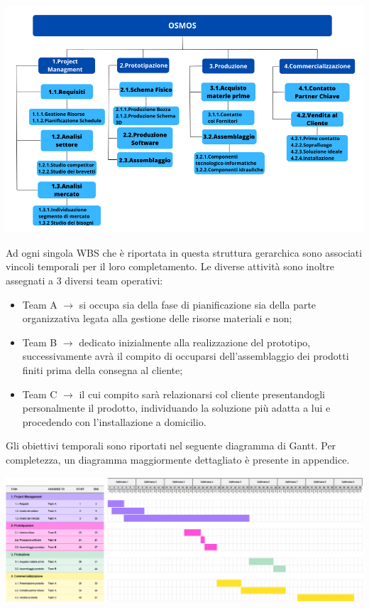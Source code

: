 \documentclass[a4paper, 12pt]{article}
\begin{document}
	\begin{center}
		\includegraphics[width=\textwidth]{Images/WBS.png}
	\end{center}
	Ad ogni singola WBS che è riportata in questa struttura gerarchica sono associati vincoli temporali per il loro completamento. Le diverse attività sono inoltre assegnati a 3 diversi team operativi:
	\begin{itemize}
		\item Team A $\rightarrow$ si occupa sia della fase di pianificazione sia della parte organizzativa legata alla gestione delle risorse materiali e non;
		\item Team B $\rightarrow$ dedicato inizialmente alla realizzazione del prototipo, successivamente avrà il compito di occuparsi dell'assemblaggio dei prodotti finiti prima della consegna al cliente;
		\item Team C $\rightarrow$ il cui compito sarà relazionarsi col cliente presentandogli personalmente il prodotto, individuando la soluzione più adatta a lui e procedendo con l'installazione a domicilio.
	\end{itemize}
	Gli obiettivi temporali sono riportati nel seguente diagramma di Gantt. Per completezza, un diagramma maggiormente dettagliato è presente in appendice.
	\begin{center}
		\includegraphics[width=\textwidth]{Images/gantt.png}
	\end{center}
	\newpage
\end{document}
